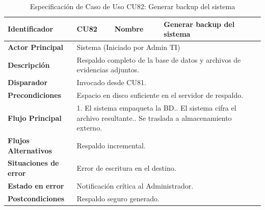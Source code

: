 \begingroup
\setlength{\parskip}{0pt}
\begin{longtable}{|p{3.5cm}|p{2cm}|p{2.5cm}|p{7cm}|}
\caption{Especificación de Caso de Uso CU82: Generar backup del sistema}
\label{tab:cu82} \\
\hline
\textbf{Identificador} & CU82 & \textbf{Nombre} & Generar backup del sistema \\ \hline
\textbf{Actor Principal} & \multicolumn{3}{p{11.5cm}|}{Sistema (Iniciado por Admin TI)} \\ \hline
\textbf{Descripción} & \multicolumn{3}{p{11.5cm}|}{Respaldo completo de la base de datos y archivos de evidencias adjuntos.} \\ \hline
\textbf{Disparador} & \multicolumn{3}{p{11.5cm}|}{Invocado desde CU81.} \\ \hline
\textbf{Precondiciones} & \multicolumn{3}{p{11.5cm}|}{Espacio en disco suficiente en el servidor de respaldo.} \\ \hline
\textbf{Flujo Principal} & \multicolumn{3}{p{11.5cm}|}{1. El sistema empaqueta la BD.\newline 2. El sistema cifra el archivo resultante.\newline 3. Se traslada a almacenamiento externo.} \\ \hline
\textbf{Flujos Alternativos} & \multicolumn{3}{p{11.5cm}|}{Respaldo incremental.} \\ \hline
\textbf{Situaciones de error} & \multicolumn{3}{p{11.5cm}|}{Error de escritura en el destino.} \\ \hline
\textbf{Estado en error} & \multicolumn{3}{p{11.5cm}|}{Notificación crítica al Administrador.} \\ \hline
\textbf{Postcondiciones} & \multicolumn{3}{p{11.5cm}|}{Respaldo seguro generado.} \\ \hline
\end{longtable}
\endgroup